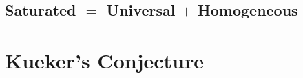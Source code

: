 \documentclass{article}
\theoremstyle{nonumberplain}
\begin{document}
\subsection{Saturated $=$ Universal $+$ Homogeneous}

\section{Kueker's Conjecture}

\begin{comment}
\section{The Proposal Proposal}

Consider the following topics, roughly in order:

\begin{itemize}
\item Brief explanation of: Language, Theory, Model. Completeness and compactness. Some simple examples to be used later.
\item Definition of partial type. Partial types can always be realized.
\item Partial type using parameters from model. Cute application: There exist nonstandard models of PA.
\item Partial types may sometimes be omitted. Definition of $\omega$-saturation, and a brief mention of $\kappa$-saturation for higher $\kappa$. Examples and non-examples.
\item Manifestations of saturation: Morley's Thesis, possibly Isabella's work (EC groups are just $\omega$-saturated models of Grp?), sketch characterization of $\aleph_0$-categorical theories, no theory has exactly two countable models. PS: Homogeneous
\item (The previous point probably requires mentioning atomicness.)
\item Remark that there seems to be a relation between saturation and counting models.
\item Enunciate Kueker's conjecture.
\item Sketch proof of the converse.
\item Talk about state of the art.
\item As part of the previous point, introduce stability. Possibly talk a little more about the concept?
\end{itemize}
\end{comment}
\end{document}
